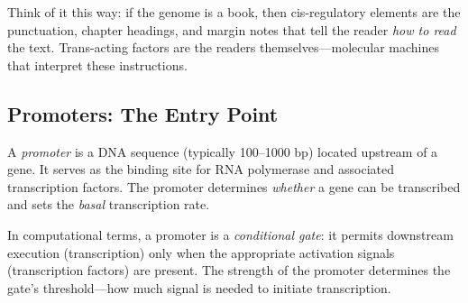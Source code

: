 Think of it this way: if the genome is a book, then cis-regulatory elements are the punctuation, chapter headings, and margin notes that tell the reader \emph{how to read} the text. Trans-acting factors are the readers themselves---molecular machines that interpret these instructions.

\subsection{Promoters: The Entry Point}

A \emph{promoter} is a DNA sequence (typically 100--1000 bp) located upstream of a gene. It serves as the binding site for RNA polymerase and associated transcription factors. The promoter determines \emph{whether} a gene can be transcribed and sets the \emph{basal} transcription rate.

\begin{dogmadef}
In computational terms, a promoter is a \emph{conditional gate}: it permits downstream execution (transcription) only when the appropriate activation signals (transcription factors) are present. The strength of the promoter determines the gate's threshold---how much signal is needed to initiate transcription.
\end{dogmadef}

